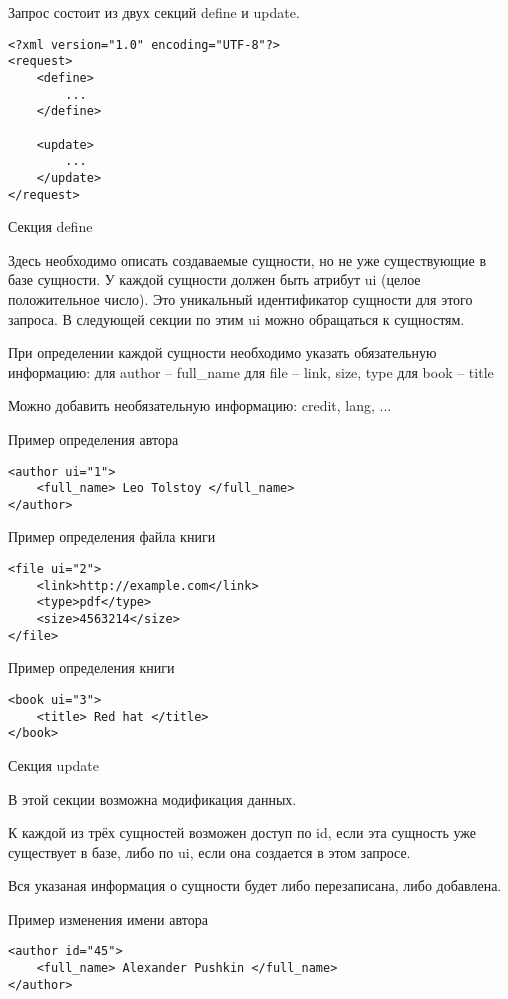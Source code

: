 Запрос состоит из двух секций define и update. 

\lstset{language=XML}
\begin{lstlisting}
<?xml version="1.0" encoding="UTF-8"?>
<request>
    <define>
        ...
    </define>

    <update>
        ...
    </update>
</request>
\end{lstlisting}


Секция define

Здесь необходимо описать создаваемые сущности, но не уже существующие в базе сущности. У каждой сущности должен быть атрибут ui (целое положительное число). Это уникальный идентификатор сущности для этого запроса. В следующей секции по этим ui можно обращаться к сущностям. 

При определении каждой сущности необходимо указать обязательную информацию: 
для author -- full\_name 
для file -- link, size, type
для book -- title 


Можно добавить необязательную информацию: credit, lang, ... 

Пример определения автора 
\lstset{language=XML}
\begin{lstlisting}
<author ui="1">
    <full_name> Leo Tolstoy </full_name>
</author>
\end{lstlisting}

Пример определения файла книги 
\lstset{language=XML}
\begin{lstlisting}
<file ui="2">
    <link>http://example.com</link>
    <type>pdf</type>
    <size>4563214</size>
</file>
\end{lstlisting}

Пример определения книги 
\lstset{language=XML}
\begin{lstlisting}
<book ui="3">
    <title> Red hat </title>
</book>
\end{lstlisting}
Секция update

В этой секции возможна модификация данных. 

К каждой из трёх сущностей возможен доступ по id, если эта сущность уже существует в базе, либо по ui, если она создается в этом запросе. 

Вся указаная информация о сущности будет либо перезаписана, либо добавлена. 

Пример изменения имени автора 
\lstset{language=XML}
\begin{lstlisting}
<author id="45">
    <full_name> Alexander Pushkin </full_name>
</author>
\end{lstlisting}

